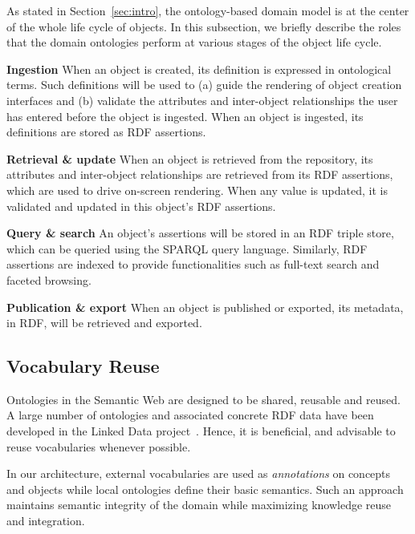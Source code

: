 \documentclass[preprint,12pt]{elsarticle}
\begin{document}
As stated in Section~\ref{sec:intro}, the ontology-based domain model is at the center of the whole life cycle of objects. In this subsection, we briefly describe the roles that the domain ontologies perform at various stages of the object life cycle.

\begin{list}{}{\leftmargin=30pt}
\item[\textbf{Ingestion}] When an object is created, its definition is expressed in ontological terms. Such definitions will be used to (a) guide the rendering of object creation interfaces and (b) validate the attributes and inter-object relationships the user has entered before the object is ingested. When an object is ingested, its definitions are stored as RDF assertions.

\item[\textbf{Retrieval \& update}] When an object is retrieved from the repository, its attributes and inter-object relationships are retrieved from its RDF assertions, which are used to drive on-screen rendering. When any value is updated, it is validated and updated in this object's RDF assertions.

\item[\textbf{Query \& search}] An object's assertions will be stored in an RDF triple store, which can be queried using the SPARQL query language. Similarly, RDF assertions are indexed to provide functionalities such as full-text search and faceted browsing. 

\item[\textbf{Publication \& export}] When an object is published or exported, its metadata, in RDF, will be retrieved and exported.
\end{list}

\subsection{Vocabulary Reuse}
Ontologies in the Semantic Web are designed to be shared, reusable and reused. A large number of ontologies and associated concrete RDF data have been developed in the Linked Data project~\cite{citeulike:5008761}. Hence, it is beneficial, and advisable to reuse vocabularies whenever possible.

In our architecture, external vocabularies are used as \emph{annotations} on concepts and objects while local ontologies define their basic semantics. Such an approach maintains semantic integrity of the domain while maximizing knowledge reuse and integration.
\end{document}

